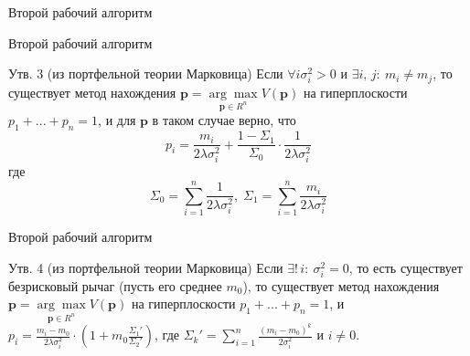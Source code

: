 \documentclass[11pt]{beamer} %
\begin{document}
    \begin{frame}{Второй рабочий алгоритм}
    \end{frame}
    \begin{frame}{Второй рабочий алгоритм}
        \begin{block}{Утв. 3 (из портфельной теории Марковица)}
            Если $\forall i \sigma_i^2 > 0$ и $\exists i,\, j: \: m_i \neq m_j$, то существует метод нахождения $\textbf{p} = \underset{\textbf{p} \in R^n}{\arg \max} V(\textbf{p})$ на гиперплоскости $p_1 + ... + p_n = 1$, и для $\textbf{p}$ в таком случае верно, что 
            $$p_i = \frac{m_i}{2\lambda \sigma_i^2} + \frac{1 - \Sigma_1}{\Sigma_0} \cdot \frac{1}{2 \lambda \sigma_i^2}$$
            где 
            $$\Sigma_0 = \sum_{i=1}^n \frac{1}{2 \lambda \sigma_i^2}, \; \Sigma_1 = \sum_{i=1}^n \frac{m_i}{2 \lambda \sigma_i^2}$$
        \end{block}
    \end{frame}
    \begin{frame}{Второй рабочий алгоритм}
        \begin{block}{Утв. 4 (из портфельной теории Марковица)}
            Если $\exists! \, i: \: \sigma_i^2 = 0$, то есть существует безрисковый рычаг (пусть его среднее $m_0$), то существует метод нахождения $\textbf{p} = \underset{\textbf{p} \in R^n}{\arg \max} V(\textbf{p})$ на гиперплоскости $p_1 + ... + p_n = 1$, и $p_i = \frac{m_i - m_0}{2 \lambda \sigma_i^2} \cdot \left(1 + m_0 \frac{\Sigma_1'}{\Sigma_2'} \right)$, где $\Sigma_k' = \sum_{i=1}^n \frac{(m_i - m_0)^k}{2 \sigma_i^2}$ и $i \neq 0$.
        \end{block}
    \end{frame}
\end{document}
